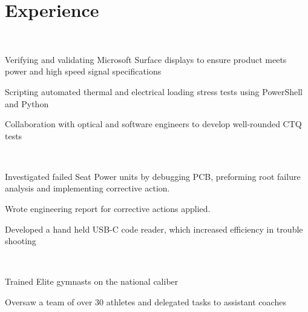 \documentclass[]{hieudo-build}
\begin{document}
\begin{minipage}[t]{0.62\textwidth} 

 \section{Experience}
 \\
\vspace{0.6em} %
\begin{tightemize}
\item Verifying and validating Microsoft Surface displays to ensure product meets power and high speed signal specifications
\item Scripting automated thermal and electrical loading stress tests using PowerShell and Python 
\item Collaboration with optical and software engineers to develop well-rounded CTQ tests
\end{tightemize}
\sectionsep 

 \\
\begin{tightemize}
\item Investigated failed Seat Power units by debugging PCB, preforming root failure analysis and implementing corrective action.
\item Wrote engineering report for corrective actions applied.
\item Developed a hand held USB-C code reader, which increased efficiency in trouble shooting
\end{tightemize}
\sectionsep

 \\
\begin{tightemize}
\item Trained Elite gymnasts on the national caliber
\item Oversaw a team of over 30 athletes and delegated tasks to assistant coaches
\end{tightemize}
\sectionsep


\end{minipage}
\end{document}
